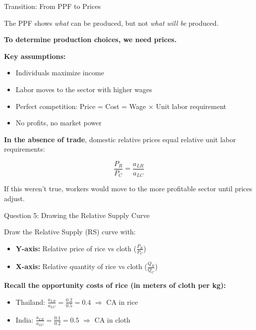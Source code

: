 \documentclass{beamer}
\begin{document}

\begin{frame}{Transition: From PPF to Prices}

The PPF shows \textit{what} can be produced, but not \textit{what will be} produced.

\vspace{0.2cm}

\textbf{To determine production choices, we need prices.}

\vspace{0.2cm}

\textbf{Key assumptions:}
\begin{itemize}
    \item Individuals maximize income
    \item Labor moves to the sector with higher wages
    \item Perfect competition: Price = Cost = Wage $\times$ Unit labor requirement
    \item No profits, no market power
\end{itemize}

\vspace{0.2cm}

\textbf{In the absence of trade}, domestic relative prices equal relative unit labor requirements:

$$\frac{P_R}{P_C} = \frac{a_{LR}}{a_{LC}}$$

\vspace{0.2cm}

\small{If this weren't true, workers would move to the more profitable sector until prices adjust.}

\end{frame}



\begin{frame}{Question 5: Drawing the Relative Supply Curve}

Draw the Relative Supply (RS) curve with:
\begin{itemize}
    \item \textbf{Y-axis:} Relative price of rice vs cloth ($\frac{P_R}{P_C}$)
    \item \textbf{X-axis:} Relative quantity of rice vs cloth ($\frac{Q_R}{Q_C}$)
\end{itemize}

\vspace{0.5cm}

\textbf{Recall the opportunity costs of rice (in meters of cloth per kg):}
\begin{itemize}
    \item Thailand: $\frac{a_{LR}}{a_{LC}} = \frac{0.2}{0.5} = 0.4$ $\Rightarrow$ CA in rice
    \item India: $\frac{a_{LR}}{a_{LC}} = \frac{0.1}{0.2} = 0.5$ $\Rightarrow$ CA in cloth
\end{itemize}

\end{frame}
\end{document}

